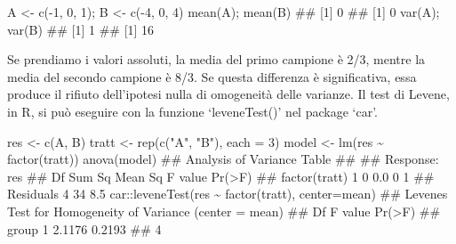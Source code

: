 \documentclass[a4paper,12pt,oneside]{book}
\newenvironment{Shaded}{\begin{snugshade}}{\end{snugshade}}
\newcommand{\DecValTok}[1]{#1}
\newcommand{\SpecialCharTok}[1]{#1}
\newcommand{\StringTok}[1]{#1}
\newcommand{\DocumentationTok}[1]{#1}
\newcommand{\OtherTok}[1]{#1}
\newcommand{\FunctionTok}[1]{#1}
\newcommand{\AttributeTok}[1]{#1}
\newcommand{\NormalTok}[1]{#1}
\begin{document}
\begin{Shaded}
\begin{Highlighting}[]
\NormalTok{A }\OtherTok{\textless{}{-}} \FunctionTok{c}\NormalTok{(}\SpecialCharTok{{-}}\DecValTok{1}\NormalTok{, }\DecValTok{0}\NormalTok{, }\DecValTok{1}\NormalTok{); B }\OtherTok{\textless{}{-}} \FunctionTok{c}\NormalTok{(}\SpecialCharTok{{-}}\DecValTok{4}\NormalTok{, }\DecValTok{0}\NormalTok{, }\DecValTok{4}\NormalTok{)}
\FunctionTok{mean}\NormalTok{(A); }\FunctionTok{mean}\NormalTok{(B)}
\DocumentationTok{\#\# [1] 0}
\DocumentationTok{\#\# [1] 0}
\FunctionTok{var}\NormalTok{(A); }\FunctionTok{var}\NormalTok{(B)}
\DocumentationTok{\#\# [1] 1}
\DocumentationTok{\#\# [1] 16}
\end{Highlighting}
\end{Shaded}

Se prendiamo i valori assoluti, la media del primo campione è 2/3, mentre la media del secondo campione è 8/3. Se questa differenza è significativa, essa produce il rifiuto dell'ipotesi nulla di omogeneità delle varianze. Il test di Levene, in R, si può eseguire con la funzione `leveneTest()' nel package `car'.

\begin{Shaded}
\begin{Highlighting}[]
\NormalTok{res }\OtherTok{\textless{}{-}} \FunctionTok{c}\NormalTok{(A, B)}
\NormalTok{tratt }\OtherTok{\textless{}{-}} \FunctionTok{rep}\NormalTok{(}\FunctionTok{c}\NormalTok{(}\StringTok{"A"}\NormalTok{, }\StringTok{"B"}\NormalTok{), }\AttributeTok{each =} \DecValTok{3}\NormalTok{)}
\NormalTok{model }\OtherTok{\textless{}{-}} \FunctionTok{lm}\NormalTok{(res }\SpecialCharTok{\textasciitilde{}} \FunctionTok{factor}\NormalTok{(tratt))}
\FunctionTok{anova}\NormalTok{(model)}
\DocumentationTok{\#\# Analysis of Variance Table}
\DocumentationTok{\#\# }
\DocumentationTok{\#\# Response: res}
\DocumentationTok{\#\#               Df Sum Sq Mean Sq F value Pr(\textgreater{}F)}
\DocumentationTok{\#\# factor(tratt)  1      0     0.0       0      1}
\DocumentationTok{\#\# Residuals      4     34     8.5}
\NormalTok{car}\SpecialCharTok{::}\FunctionTok{leveneTest}\NormalTok{(res }\SpecialCharTok{\textasciitilde{}} \FunctionTok{factor}\NormalTok{(tratt), }\AttributeTok{center=}\NormalTok{mean)}
\DocumentationTok{\#\# Levene\textquotesingle{}s Test for Homogeneity of Variance (center = mean)}
\DocumentationTok{\#\#       Df F value Pr(\textgreater{}F)}
\DocumentationTok{\#\# group  1  2.1176 0.2193}
\DocumentationTok{\#\#        4}
\end{Highlighting}
\end{Shaded}
\end{document}
